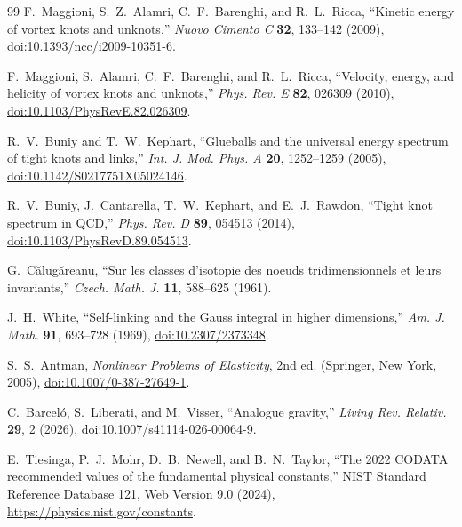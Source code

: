 \documentclass[aps,pre,preprint,notitlepage,nofootinbib,superscriptaddress]{revtex4-2}
\begin{document}
\begin{thebibliography}{99}
F.~Maggioni, S.~Z.~Alamri, C.~F.~Barenghi, and R.~L.~Ricca,
``Kinetic energy of vortex knots and unknots,''
\emph{Nuovo Cimento C} \textbf{32}, 133--142 (2009),
\href{https://doi.org/10.1393/ncc/i2009-10351-6}{doi:10.1393/ncc/i2009-10351-6}.

F.~Maggioni, S.~Alamri, C.~F.~Barenghi, and R.~L.~Ricca,
``Velocity, energy, and helicity of vortex knots and unknots,''
\emph{Phys. Rev. E} \textbf{82}, 026309 (2010),
\href{https://doi.org/10.1103/PhysRevE.82.026309}{doi:10.1103/PhysRevE.82.026309}.

R.~V.~Buniy and T.~W.~Kephart,
``Glueballs and the universal energy spectrum of tight knots and links,''
\emph{Int. J. Mod. Phys. A} \textbf{20}, 1252--1259 (2005),
\href{https://doi.org/10.1142/S0217751X05024146}{doi:10.1142/S0217751X05024146}.

R.~V.~Buniy, J.~Cantarella, T.~W.~Kephart, and E.~J.~Rawdon,
``Tight knot spectrum in QCD,''
\emph{Phys. Rev. D} \textbf{89}, 054513 (2014),
\href{https://doi.org/10.1103/PhysRevD.89.054513}{doi:10.1103/PhysRevD.89.054513}.

G.~C\u{a}lug\u{a}reanu,
``Sur les classes d'isotopie des noeuds tridimensionnels et leurs invariants,''
\emph{Czech. Math. J.} \textbf{11}, 588--625 (1961).

J.~H.~White,
``Self-linking and the Gauss integral in higher dimensions,''
\emph{Am. J. Math.} \textbf{91}, 693--728 (1969),
\href{https://doi.org/10.2307/2373348}{doi:10.2307/2373348}.

S.~S.~Antman,
\emph{Nonlinear Problems of Elasticity}, 2nd ed.
(Springer, New York, 2005),
\href{https://doi.org/10.1007/0-387-27649-1}{doi:10.1007/0-387-27649-1}.

C.~Barcel\'o, S.~Liberati, and M.~Visser,
``Analogue gravity,''
\emph{Living Rev. Relativ.} \textbf{29}, 2 (2026),
\href{https://doi.org/10.1007/s41114-026-00064-9}{doi:10.1007/s41114-026-00064-9}.

E.~Tiesinga, P.~J.~Mohr, D.~B.~Newell, and B.~N.~Taylor,
``The 2022 CODATA recommended values of the fundamental physical constants,''
NIST Standard Reference Database 121, Web Version 9.0 (2024),
\url{https://physics.nist.gov/constants}.

\end{thebibliography}
\end{document}
